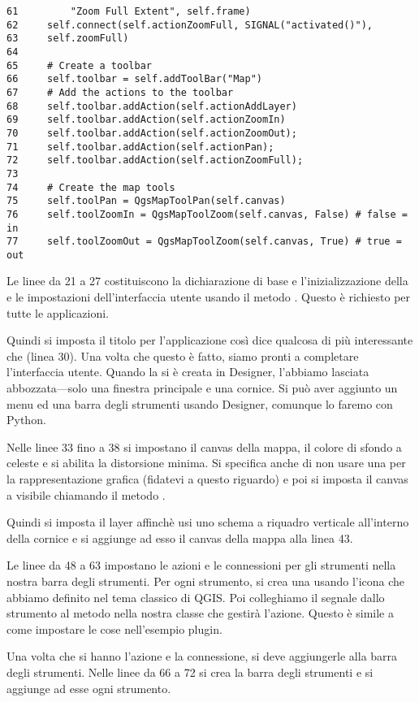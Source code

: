 \begin{verbatim}
61         "Zoom Full Extent", self.frame)
62     self.connect(self.actionZoomFull, SIGNAL("activated()"),
63     self.zoomFull)
64 
65     # Create a toolbar
66     self.toolbar = self.addToolBar("Map")
67     # Add the actions to the toolbar
68     self.toolbar.addAction(self.actionAddLayer)
69     self.toolbar.addAction(self.actionZoomIn)
70     self.toolbar.addAction(self.actionZoomOut);
71     self.toolbar.addAction(self.actionPan);
72     self.toolbar.addAction(self.actionZoomFull);
73 
74     # Create the map tools
75     self.toolPan = QgsMapToolPan(self.canvas)
76     self.toolZoomIn = QgsMapToolZoom(self.canvas, False) # false = in
77     self.toolZoomOut = QgsMapToolZoom(self.canvas, True) # true = out
\end{verbatim}

Le linee da 21 a 27 costituiscono la dichiarazione di base e l'inizializzazione della 
 e le impostazioni dell'interfaccia utente usando il metodo 
. Questo è richiesto per tutte le applicazioni.

Quindi si imposta il titolo per l'applicazione così dice qualcosa di più interessante che  (linea 30). Una volta che questo è fatto, siamo pronti a completare l'interfaccia utente. Quando la si è creata in Designer, l'abbiamo lasciata abbozzata---solo una finestra principale e una cornice. Si può aver aggiunto un menu ed una barra degli strumenti usando Designer, comunque lo faremo con Python.

Nelle linee 33 fino a 38 si impostano il canvas della mappa, il colore di sfondo a celeste e si abilita la distorsione minima. Si specifica anche di non usare una  per la rappresentazione grafica (fidatevi a questo riguardo) e poi si imposta il canvas a visibile chiamando il metodo .

Quindi si imposta il layer affinchè usi uno schema a riquadro verticale all'interno della cornice e si aggiunge ad esso il canvas della mappa alla linea 43.

Le linee da 48 a 63 impostano le azioni e le connessioni per gli strumenti nella nostra barra degli strumenti. Per ogni strumento, si crea una  usando l'icona che abbiamo definito nel tema classico di QGIS. Poi colleghiamo il segnale  dallo strumento al metodo nella nostra classe che gestirà l'azione. Questo è simile a come impostare le cose nell'esempio plugin.

Una volta che si hanno l'azione e la connessione, si deve aggiungerle alla barra degli strumenti.
Nelle linee da 66 a 72 si crea la barra degli strumenti e si aggiunge ad esse ogni strumento.

